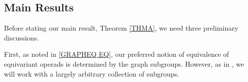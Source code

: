 \documentclass[a4paper,10pt
,draft
]{article}%
\numberwithin{equation}{section}
\numberwithin{figure}{section}
\theoremstyle{definition} %
\renewcommand{\O}{\ensuremath{\mathcal O}}
\newcommand{\1}{\ensuremath{\mathbbm 1}}%
\begin{document}







\subsection{Main Results}


Before stating our main result, Theorem \ref{THMA},
we need three preliminary discussions.

First, as noted in \eqref{GRAPHEQ EQ},
our preferred notion of equivalence of equivariant operads is determined by the graph subgroups.
However, as in \cite{BP_FCOP}, we will work with a largely arbitrary collection of subgroups.
\end{document}
